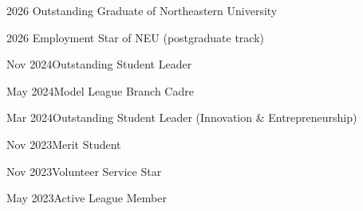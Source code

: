 \documentclass[a4paper]{article}
\newcommand{\bodyfont}{\fontsize{9.5}{11.4}\selectfont\color{bodygray}}
\newcommand{\cvsection}[2][0pt]{%
  \par\vspace{2.6pt}\noindent
  \hspace{#1}{\bfseries\fontsize{11.04}{12}\selectfont\color{headpurple}#2}%
  \par\nointerlineskip\vspace{0.5pt}%
  \noindent\hspace{5pt}\smash{\textcolor{rulepurple}{\rule{525pt}{1.05pt}}}%
  \par\nointerlineskip\vspace{2.2pt}}
\begin{document}
\cvsection[5.2pt]{Others}
\bodyfont
\begin{minipage}[t]{0.591\textwidth}
2026 Outstanding Graduate of Northeastern University
\end{minipage}%
\begin{minipage}[t]{0.409\textwidth}
2026 Employment Star of NEU (postgraduate track)
\end{minipage}

\vspace{0.7pt}
\begin{minipage}[t]{0.591\textwidth}
Nov 2024\quad Outstanding Student Leader
\end{minipage}%
\begin{minipage}[t]{0.409\textwidth}
May 2024\quad Model League Branch Cadre
\end{minipage}

\begin{minipage}[t]{0.591\textwidth}
Mar 2024\quad Outstanding Student Leader (Innovation \& Entrepreneurship)
\end{minipage}%
\begin{minipage}[t]{0.409\textwidth}
Nov 2023\quad Merit Student
\end{minipage}

\begin{minipage}[t]{0.591\textwidth}
Nov 2023\quad Volunteer Service Star
\end{minipage}%
\begin{minipage}[t]{0.409\textwidth}
May 2023\quad Active League Member
\end{minipage}
\end{document}

